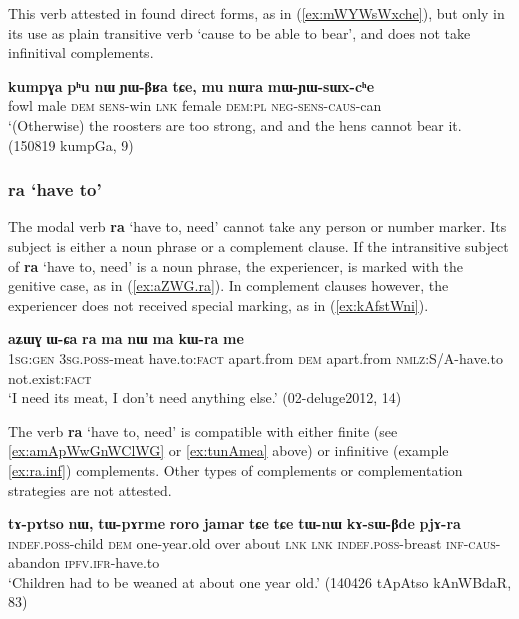 \documentclass[oneside,a4paper,11pt]{article}
\newcommand{\ipa}[1]{\textbf{\phon#1}} %
\newcommand{\jpg}[2]{\ipa{#1} `#2'} %
\newcommand{\refb}[1]{(\ref{#1})}
\begin{document}
This verb attested in found direct forms, as in \refb{ex:mWYWsWxche}, but only in its use as plain transitive verb `cause to be able to bear', and does not take infinitival complements.

\begin{exe}
\ex \label{ex:mWYWsWxche}
\gll 
\ipa{kumpɣa} 	\ipa{pʰu} 	\ipa{nɯ} 	\ipa{ɲɯ-βʁa} 	\ipa{tɕe,} 	\ipa{mu} 	\ipa{nɯra} 	\ipa{mɯ-ɲɯ-sɯx-cʰe} \\
fowl male \textsc{dem} \textsc{sens}-win \textsc{lnk} female \textsc{dem:pl} \textsc{neg-sens-caus}-can \\
\glt `(Otherwise) the roosters are too strong, and and the hens cannot bear it. (150819 kumpGa, 9)
\end{exe} 

  \subsubsection{\jpg{ra}{have to}} \label{sec:ra}
  The modal verb \jpg{ra}{have to, need} cannot take any person or number marker. Its subject is either a noun phrase or a complement clause. If the intransitive subject of \jpg{ra}{have to, need} is a noun phrase, the experiencer, is marked with the genitive case, as in (\ref{ex:aZWG.ra}). In complement clauses however, the experiencer does not received special marking, as in \refb{ex:kAfstWni}.
    
  \begin{exe}
\ex \label{ex:aZWG.ra}
\gll \ipa{aʑɯɣ} 	\ipa{ɯ-ɕa} 	\ipa{ra} 	\ipa{ma} 	\ipa{nɯ} 	\ipa{ma} 	\ipa{kɯ-ra} 	\ipa{me} \\
\textsc{1sg:gen} \textsc{3sg.poss}-meat have.to:\textsc{fact} apart.from \textsc{dem} apart.from \textsc{nmlz:S/A}-have.to not.exist:\textsc{fact} \\
\glt `I need its meat, I don't need anything else.' (02-deluge2012, 14)
\end{exe}
 
 The verb \jpg{ra}{have to, need}  is compatible with either finite (see \ref{ex:amApWwGnWClWG} or \ref{ex:tunAmea} above) or infinitive (example \ref{ex:ra.inf}) complements. Other types of complements or complementation strategies are not attested.
 
 \begin{exe}
\ex \label{ex:ra.inf}
\gll   \ipa{tɤ-pɤtso} 	\ipa{nɯ,} 	\ipa{tɯ-pɤrme} 	\ipa{roro} 	\ipa{jamar} 	\ipa{tɕe} 	\ipa{tɕe} 	\ipa{tɯ-nɯ} 	\ipa{kɤ-sɯ-βde} 	\ipa{pjɤ-ra}  \\
\textsc{indef.poss}-child \textsc{dem} one-year.old over about \textsc{lnk} \textsc{lnk} \textsc{indef.poss}-breast \textsc{inf-caus}-abandon \textsc{ipfv.ifr}-have.to \\
\glt  `Children had to be weaned at about one year old.' (140426 tApAtso kAnWBdaR, 83)
\end{exe}  
\end{document}
